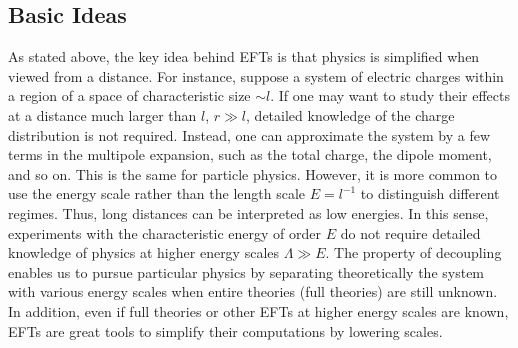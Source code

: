 \subsection{Basic Ideas}
As stated above, the key idea behind EFTs is that physics is simplified when viewed from a distance. For instance, suppose a system of electric charges within a region of a space of characteristic size $\sim l$. If one may want to study their effects at a distance much larger than $l$, $r \gg l$, detailed knowledge of the charge distribution is not required. Instead, one can approximate the system by a few terms in the multipole expansion, such as the total charge, the dipole moment, and so on. This is the same for particle physics. However, it is more common to use the energy scale rather than the length scale $E = l^{-1}$ to distinguish different regimes. Thus, long distances can be interpreted as low energies. In this sense, experiments with the characteristic energy of order $E$ do not require detailed knowledge of physics at higher energy scales $\Lambda \gg E$. The property of decoupling enables us to pursue particular physics by separating theoretically the system with various energy scales when entire theories (full theories) are still unknown. In addition, even if full theories or other EFTs at higher energy scales are known, EFTs are great tools to simplify their computations by lowering scales.  



